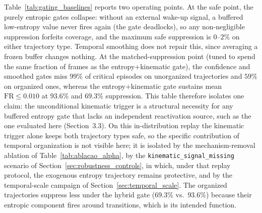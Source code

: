 \documentclass[a4paper,fleqn]{cas-dc}
\begin{document}
{Table~\ref{tab:gating_baselines} reports two operating points. At the safe
point, the purely entropic gates collapse: without an external wake-up signal,
a buffered low-entropy value never fires again (the gate deadlocks), so any
non-negligible suppression forfeits coverage, and the maximum safe suppression
is $0$--$2\%$ on either trajectory type. Temporal smoothing does not repair
this, since averaging a frozen buffer changes nothing. At the
matched-suppression point (tuned to spend the same fraction of frames as the
entropy+kinematic gate), the confidence and smoothed gates miss
$99\%$ of critical episodes on unorganized trajectories and $59\%$ on
organized ones, whereas the entropy+kinematic gate sustains mean
$\mathrm{FR} \le 0.010$ at $93.6\%$ and $69.3\%$ suppression. This table
therefore isolates one claim: the unconditional kinematic trigger is a
structural necessity for any buffered entropy gate that lacks an independent reactivation source, such as the one evaluated here (Section~3.3). On this
in-distribution replay the kinematic trigger alone keeps both trajectory
types safe, so the specific contribution of temporal organization is not
visible here; it is isolated by the mechanism-removal ablation of
Table~\ref{tab:ablacao_alpha}, by the
\texttt{kinematic\_\allowbreak signal\_\allowbreak missing} scenario of
Section~\ref{sec:robustness_controls}{\color{\revcolor}, in which, under that
replay protocol, the exogenous entropy trajectory remains protective}, and by the temporal-scale campaign of
Section~\ref{sec:temporal_scale}. The organized trajectories suppress less
under the hybrid gate ($69.3\%$ vs.\ $93.6\%$) because their entropic component
fires around transitions, which is its intended function.

}
\end{document}
